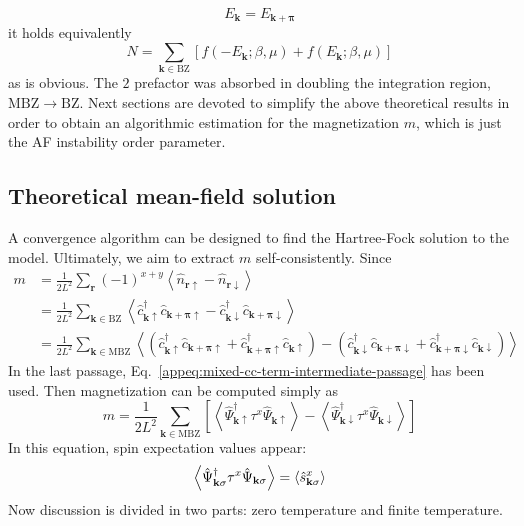 \[
	E_\mathbf{k} = E_{\mathbf{k}+\bm{\pi}}
\]
it holds equivalently
\begin{equation}\label{appeq:spinor-particle-number-formula-BZ}
	N = \sum_{\mathbf{k} \in \mathrm{BZ}} \left[
		f\left(
			-E_\mathbf{k}; \beta,\mu 
		\right) + f \left(
			E_\mathbf{k}; \beta,\mu 
		\right)
	\right]
\end{equation}
as is obvious. The $2$ prefactor was absorbed in doubling the integration region, $\mathrm{MBZ}\to\mathrm{BZ}$. Next sections are devoted to simplify the above theoretical results in order to obtain an algorithmic estimation for the magnetization $m$, which is just the AF instability order parameter. 

\subsection{Theoretical mean-field solution}

A convergence algorithm can be designed to find the Hartree-Fock solution to the model. Ultimately, we aim to extract $m$ self-consistently. Since
\[
\begin{aligned}
	m &= \frac{1}{2L^2} \sum_\mathbf{r} (-1)^{x+y} \left\langle
		\hat n_{\mathbf{r}\uparrow} - \hat n_{\mathbf{r}\downarrow}
	\right\rangle \\
	&= \frac{1}{2L^2} \sum_{\mathbf{k} \in \mathrm{BZ}} \left\langle
		\hat c_{\mathbf{k}\uparrow}^\dagger \hat c_{\mathbf{k}+\bm{\pi}\uparrow} - \hat c_{\mathbf{k}\downarrow}^\dagger \hat c_{\mathbf{k}+\bm{\pi}\downarrow}
	\right\rangle \\
	&= \frac{1}{2L^2} \sum_{\mathbf{k} \in \mathrm{MBZ}} \left\langle
			\left(
				\hat c_{\mathbf{k}\uparrow}^\dagger \hat c_{\mathbf{k}+\bm{\pi}\uparrow} + \hat c_{\mathbf{k}+\bm{\pi}\uparrow}^\dagger \hat c_{\mathbf{k}\uparrow}	
			\right) - \left(
				\hat c_{\mathbf{k}\downarrow}^\dagger \hat c_{\mathbf{k}+\bm{\pi}\downarrow} + \hat c_{\mathbf{k}+\bm{\pi}\downarrow}^\dagger \hat c_{\mathbf{k}\downarrow}	
			\right)
		\right\rangle
\end{aligned}
\]
In the last passage, Eq.~\eqref{appeq:mixed-cc-term-intermediate-passage} has been used. Then magnetization can be computed simply as
\begin{equation}\label{appeq:antiferromagnet-magnetization-self-consistence-abstract}
	m = \frac{1}{2L^2} \sum_{\mathbf{k} \in \mathrm{MBZ}} \left[
		\left\langle 
			\hat \Psi_{\mathbf{k}\uparrow}^\dagger \tau^x \hat \Psi_{\mathbf{k}\uparrow}
		\right\rangle - \left\langle 
			\hat \Psi_{\mathbf{k}\downarrow}^\dagger \tau^x \hat \Psi_{\mathbf{k}\downarrow}
		\right\rangle
	\right]
\end{equation}
In this equation, spin expectation values appear:
\[
	\left\langle 
		\hat \Psi_{\mathbf{k}\sigma}^\dagger \tau^x \hat \Psi_{\mathbf{k}\sigma}
	\right\rangle = \ev{\hat s_{\mathbf{k}\sigma}^x}
\]
Now discussion is divided in two parts: zero temperature and finite temperature.

